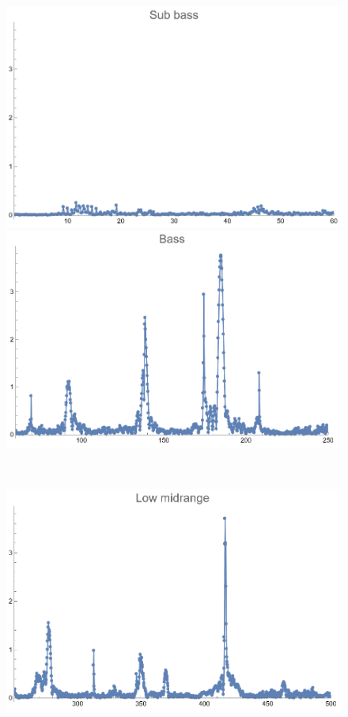 \documentclass[12pt, letterpaper]{article}
\begin{document}
\begin{figure}[H]
  \centering
  \begin{minipage}{.3\textwidth}
    \centering
    \includegraphics[width=.9\linewidth]{imgs/Cancion4/subbass.png}
  \end{minipage}
  \begin{minipage}{0.03\textwidth}\end{minipage}
  \begin{minipage}{.3\textwidth}
    \centering
    \includegraphics[width=.9\linewidth]{imgs/Cancion4/bass.png}
  \end{minipage} \medskip \\
  \begin{minipage}{.3\textwidth}
    \centering
    \includegraphics[width=.9\linewidth]{imgs/Cancion4/lowmid.png}

\end{minipage}
\end{figure}
\end{document}
